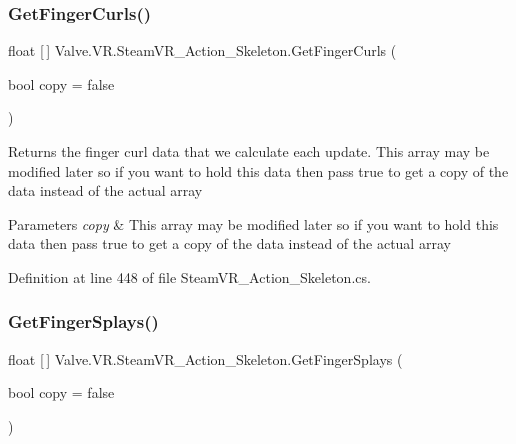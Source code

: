 \mbox{\label{class_valve_1_1_v_r_1_1_steam_v_r___action___skeleton_a268243d4d19a66128eae23d0517a0c24}} 
\subsubsection{\texorpdfstring{GetFingerCurls()}{GetFingerCurls()}}
{\footnotesize\ttfamily float \mbox{[}$\,$\mbox{]} Valve.\+V\+R.\+Steam\+V\+R\+\_\+\+Action\+\_\+\+Skeleton.\+Get\+Finger\+Curls (\begin{DoxyParamCaption}\item[{bool}]{copy = {\ttfamily false} }\end{DoxyParamCaption})}



Returns the finger curl data that we calculate each update. This array may be modified later so if you want to hold this data then pass true to get a copy of the data instead of the actual array 


\begin{DoxyParams}{Parameters}
{\em copy} & This array may be modified later so if you want to hold this data then pass true to get a copy of the data instead of the actual array\\
\hline
\end{DoxyParams}


Definition at line 448 of file Steam\+V\+R\+\_\+\+Action\+\_\+\+Skeleton.\+cs.

\mbox{\label{class_valve_1_1_v_r_1_1_steam_v_r___action___skeleton_af2b48ca77472521036964cb48fcb773c}} 
\subsubsection{\texorpdfstring{GetFingerSplays()}{GetFingerSplays()}}
{\footnotesize\ttfamily float \mbox{[}$\,$\mbox{]} Valve.\+V\+R.\+Steam\+V\+R\+\_\+\+Action\+\_\+\+Skeleton.\+Get\+Finger\+Splays (\begin{DoxyParamCaption}\item[{bool}]{copy = {\ttfamily false} }\end{DoxyParamCaption})}




